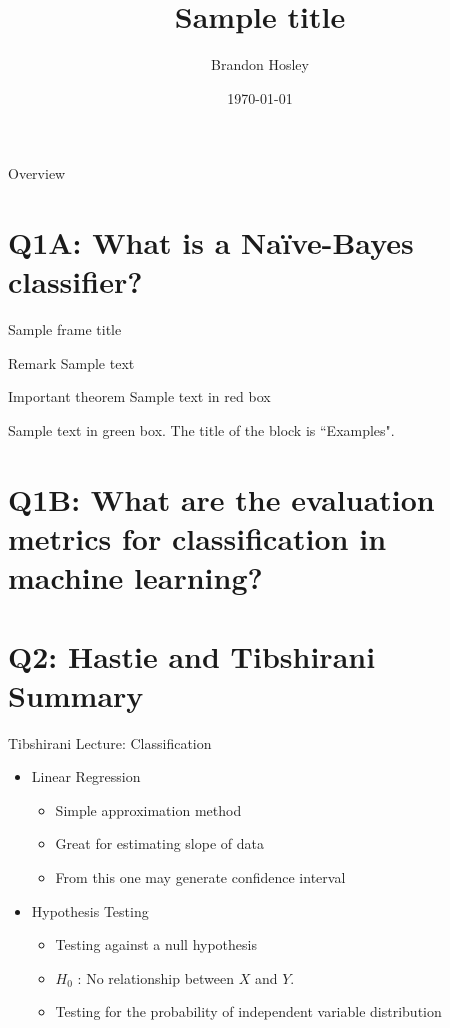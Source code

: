 \documentclass{beamer}
\title{Sample title}
\author{Brandon Hosley}
\institute{University of Illinois - Springfield}
\date{\today}
\begin{document}
\frame{\titlepage}

\begin{frame}{Overview}
\tableofcontents
\end{frame}

\section[Q1.1]{Q1A: What is a Na\"{i}ve-Bayes classifier?}

\begin{frame}{Sample frame title}
\begin{block}{Remark}
	Sample text
\end{block}

\begin{alertblock}{Important theorem}
	Sample text in red box
\end{alertblock}

\begin{examples}
	Sample text in green box. The title of the block is ``Examples".
\end{examples}

\end{frame}

\section[Q1.2]{Q1B: What are the evaluation metrics for classification in machine learning?}

\section[Q2]{Q2: Hastie and Tibshirani Summary}

\begin{frame}{Tibshirani Lecture: Classification}
\begin{itemize}
	\item<1-> Linear Regression
	\begin{itemize}
		\item<1-> Simple approximation method
		\item<1-> Great for estimating slope of data
		\item<1-> From this one may generate confidence interval
	\end{itemize}
	\item<2> Hypothesis Testing
	\begin{itemize}
		\item<2> Testing against a null hypothesis
		\item<2>[] $H_0$ : No relationship between $X$ and $Y$.
		\item<2> Testing for the probability of independent variable distribution 
	\end{itemize}
\end{itemize}
\end{frame}
\end{document}
